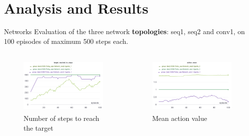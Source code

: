 \documentclass[10pt, xcolor={dvipsnames}]{beamer}
\begin{document}
\section{Analysis and Results}
{
\begin{frame}{Networks}
    Evaluation of the three network \textbf{topologies}: \alert{seq1}, \alert{seq2} and \alert{conv1}, on 100 episodes of maximum 500 steps each.
    
    \begin{columns}
        \begin{figure}
            \centering
            \includegraphics[width=1\textwidth, height=0.75\textwidth]{assets/results/nets/target_reached_in_steps.png}
            \caption*{Number of steps to reach the target}
        \end{figure}
        
        \begin{figure}
            \centering
            \includegraphics[width=1\textwidth, height=0.75\textwidth]{assets/results/nets/action_mean.png}
            \caption*{Mean action value}
        \end{figure}
    \end{columns}
\end{frame}
}
\end{document}
